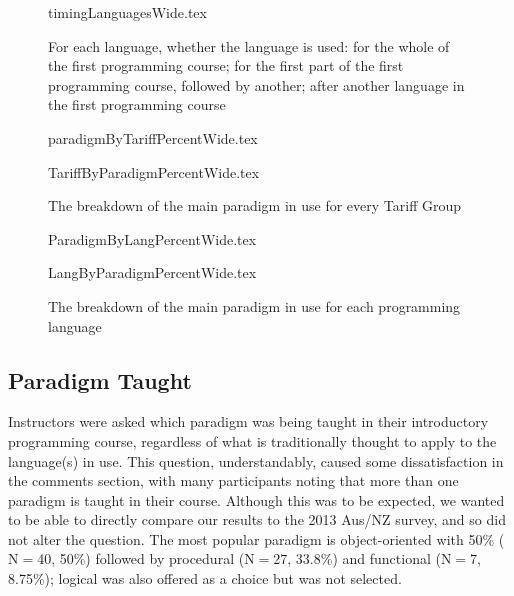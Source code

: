 \documentclass[english]{programming}
\begin{document}
\begin{figure}
\begin{center}
{timingLanguagesWide.tex}
\end{center}
\caption{For each language, whether the language is used: for the whole of the first programming course; for the first part of the first programming course, followed by another; after another language in the first programming course
\label{fig:timing}}
\end{figure}




\begin{figure}
\begin{center}
{paradigmByTariffPercentWide.tex}
\end{center}
\begin{center}
{TariffByParadigmPercentWide.tex}
\end{center}
\caption{The breakdown of the main paradigm in use for every Tariff Group\label{fig:paradigmTariff}}
\end{figure}

\begin{figure}
\begin{center}
{ParadigmByLangPercentWide.tex}
\end{center}
\begin{center}
{LangByParadigmPercentWide.tex}
\end{center}
\caption{The breakdown of the main paradigm in use for each programming language\label{fig:paradigmLang}}
\end{figure}

\subsection{Paradigm Taught}

Instructors were asked which paradigm was being taught in their
introductory programming course, regardless of what is traditionally
thought to apply to the language(s) in use. This question,
understandably, caused some dissatisfaction in the comments section,
with many participants noting that more than one paradigm is taught in
their course. Although this was to be expected, we wanted to be able
to directly compare our results to the 2013 Aus/NZ survey, and so did
not alter the question. The most popular paradigm is object-oriented
with 50\% ($\mathrm{N}=40$, 50\%) followed by procedural
($\mathrm{N}=27$, 33.8\%) and functional ($\mathrm{N}=7$, 8.75\%);
logical was also offered as a choice but was not selected.
\end{document}
